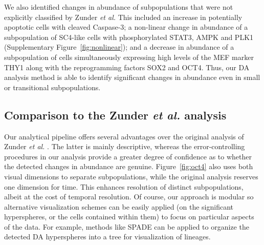 \documentclass{article}
\begin{document}
We also identified changes in abundance of subpopulations that were not explicitly classified by Zunder \emph{et al.}
This included an increase in potentially apoptotic cells with cleaved Caspase-3;
a non-linear change in abundance of a subpopulation of SC4-like cells with phosphorylated STAT3, AMPK and PLK1 (Supplementary Figure~\ref{fig:nonlinear});
and a decrease in abundance of a subpopulation of cells simultaneously expressing high levels of the MEF marker THY1 along with the reprogramming factors SOX2 and OCT4.
Thus, our DA analysis method is able to identify significant changes in abundance even in small or transitional subpopulations.

\subsection{Comparison to the Zunder \textit{et al.} analysis}
Our analytical pipeline offers several advantages over the original analysis of Zunder \emph{et al.} \cite{zunder2015continuous}.
The latter is mainly descriptive, whereas the error-controlling procedures in our analysis provide a greater degree of confidence as to whether the detected changes in abundance are genuine.
Figure~\ref{fig:oct4} also uses both visual dimensions to separate subpopulations, while the original analysis reserves one dimension for time.
This enhances resolution of distinct subpopulations, albeit at the cost of temporal resolution.
Of course, our approach is modular so alternative visualization schemes can be easily applied (on the significant hyperspheres, or the cells contained within them) to focus on particular aspects of the data.
For example, methods like SPADE can be applied to organize the detected DA hyperspheres into a tree for visualization of lineages.
\end{document}
